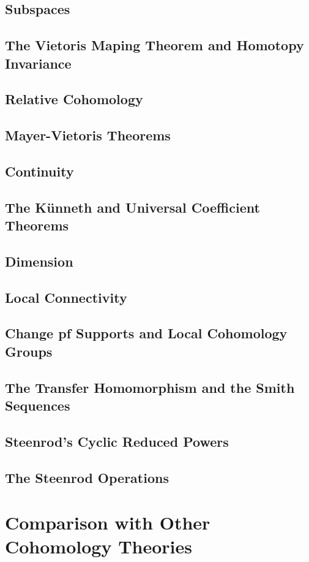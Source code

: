 \subsection{Subspaces}
\subsection{The Vietoris Maping Theorem and Homotopy Invariance}
\subsection{Relative Cohomology}
\subsection{Mayer-Vietoris Theorems}
\subsection{Continuity}
\subsection{The Künneth and Universal Coefficient Theorems}
\subsection{Dimension}
\subsection{Local Connectivity}
\subsection{Change pf Supports and Local Cohomology Groups}
\subsection{The Transfer Homomorphism and the Smith Sequences}
\subsection{Steenrod's Cyclic Reduced Powers}
\subsection{The Steenrod Operations}

\section{Comparison with Other Cohomology Theories}
